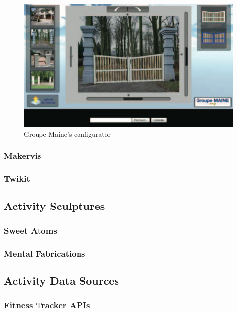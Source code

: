 \documentclass[medieninformatik-arbeit.tex]{subfiles}
\begin{document}
\begin{figure}[hb]
\begin{center}
  \includegraphics[width=.9\linewidth]{RelatedWork/img/gates-config}
  \caption{Groupe Maine's configurator\cite{rolland2012commerce} }
\label{fig:gates-config}
\end{center}
\end{figure}

\subsubsection{Makervis}

\subsubsection{Twikit}

\subsection{Activity Sculptures}

\subsubsection{Sweet Atoms}

\subsubsection{Mental Fabrications}

\subsection{Activity Data Sources}

\subsubsection{Fitness Tracker APIs}
\end{document}

